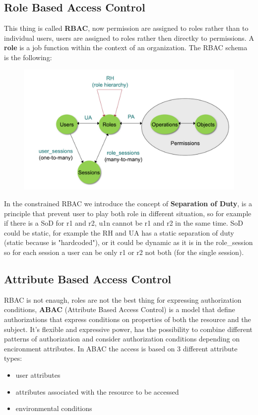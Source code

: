 \subsection{Role Based Access Control}
This thing is called \textbf{RBAC}, now permission are assigned to roles rather than to individual users, users are assigned to roles rather then directky to permissions. A \textbf{role} is a job function within the context of an organization. The RBAC schema is the following:

\begin{figure}[h!]
    \centering
    \includegraphics[scale=0.35]{images/rbac.png}
\end{figure}
\FloatBarrier
In the constrained RBAC we introduce the concept of \textbf{Separation of Duty}, is a principle that prevent user to play both role in different situation, so for example if there is a SoD for r1 and r2, u1n cannot be r1 and r2 in the same time. SoD could be static, for example the RH and UA has a static separation of duty (static because is "hardcoded"), or it could be dynamic as it is in the role\_session so for each session a user can be only r1 or r2 not both (for the single session).

\subsection{Attribute Based Access Control}
RBAC is not enaugh, roles are not the best thing for expressing authorization conditions, \textbf{ABAC} (Attribute Based Access Control) is a model that define authorizations that express conditions on properties of both the resource and the subject. It's flexible and expressive power, has the possibility to combine different patterns of authorization and consider authorization conditions depending on encironment attributes.
In ABAC the access is based on 3 different attribute types:
\begin{itemize}
    \item user attributes
    \item attributes associated with the resource to be accessed
    \item environmental conditions
\end{itemize}

